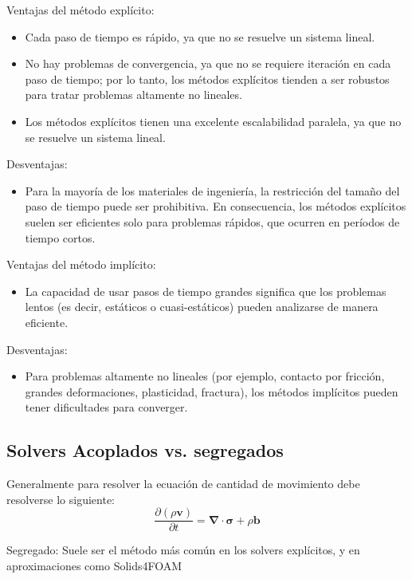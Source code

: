 \documentclass{article}
\begin{document}
Ventajas del método explícito:
\begin{itemize}
\item Cada paso de tiempo es rápido, ya que no se resuelve un sistema lineal.
\item No hay problemas de convergencia, ya que no se requiere iteración en cada paso de tiempo; por lo tanto, los métodos explícitos tienden a ser robustos para tratar problemas altamente no lineales.
\item Los métodos explícitos tienen una excelente escalabilidad paralela, ya que no se resuelve un sistema lineal.
\end{itemize}
Desventajas:
\begin{itemize}
\item Para la mayoría de los materiales de ingeniería, la restricción del tamaño del paso de tiempo puede ser prohibitiva. En consecuencia, los métodos explícitos suelen ser eficientes solo para problemas rápidos, que ocurren en períodos de tiempo cortos.
\end{itemize}

Ventajas del método implícito:
\begin{itemize}
\item 
La capacidad de usar pasos de tiempo grandes significa que los problemas lentos (es decir, estáticos o cuasi-estáticos) pueden analizarse de manera eficiente.
\end{itemize}
Desventajas:
\begin{itemize}
\item 
Para problemas altamente no lineales (por ejemplo, contacto por fricción, grandes deformaciones, plasticidad, fractura), los métodos implícitos pueden tener dificultades para converger.
\end{itemize}


\subsection{Solvers Acoplados vs. segregados}
Generalmente para resolver la ecuación de cantidad de movimiento debe resolverse lo siguiente:\\
\begin{equation}
\frac{\partial (\rho \boldsymbol{v})}{\partial t} = \boldsymbol{\nabla} \cdot \boldsymbol{\sigma} + \rho \boldsymbol{b}
\end{equation}

Segregado: Suele ser el método más común en los solvers explícitos, y en aproximaciones como Solids4FOAM
\end{document}
